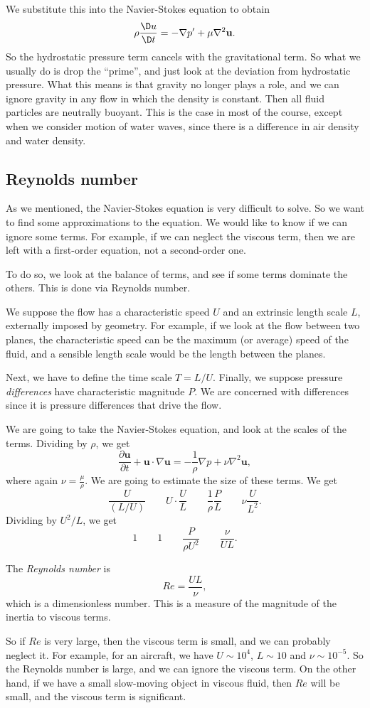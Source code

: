 \documentclass[a4paper]{article}
\begin{document}
We substitute this into the Navier-Stokes equation to obtain
\[
  \rho \frac{\D u}{\D t} = -\nabla p' + \mu \nabla^2 \mathbf{u}.
\]
So the hydrostatic pressure term cancels with the gravitational term. So what we usually do is drop the ``prime'', and just look at the deviation from hydrostatic pressure. What this means is that gravity no longer plays a role, and we can ignore gravity in any flow in which the density is constant. Then all fluid particles are neutrally buoyant. This is the case in most of the course, except when we consider motion of water waves, since there is a difference in air density and water density.

\subsection{Reynolds number}
As we mentioned, the Navier-Stokes equation is very difficult to solve. So we want to find some approximations to the equation. We would like to know if we can ignore some terms. For example, if we can neglect the viscous term, then we are left with a first-order equation, not a second-order one.

To do so, we look at the balance of terms, and see if some terms dominate the others. This is done via Reynolds number.

We suppose the flow has a characteristic speed $U$ and an extrinsic length scale $L$, externally imposed by geometry. For example, if we look at the flow between two planes, the characteristic speed can be the maximum (or average) speed of the fluid, and a sensible length scale would be the length between the planes.

Next, we have to define the time scale $T = L/U$. Finally, we suppose pressure \emph{differences} have characteristic magnitude $P$. We are concerned with differences since it is pressure differences that drive the flow.

We are going to take the Navier-Stokes equation, and look at the scales of the terms. Dividing by $\rho$, we get
\[
  \frac{\partial \mathbf{u}}{\partial t} + \mathbf{u}\cdot \nabla \mathbf{u} = -\frac{1}{\rho} \nabla p + \nu \nabla^2 \mathbf{u},
\]
where again $\nu = \frac{\mu}{\rho}$. We are going to estimate the size of these terms. We get
\[
  \frac{U}{(L/U)} \quad\quad U \cdot \frac{U}{L} \quad\quad \frac{1}{\rho} \frac{P}{L} \quad\quad \nu \frac{U}{L^2}.
\]
Dividing by $U^2/L$, we get
\[
  1 \quad\quad 1 \quad\quad \frac{P}{\rho U^2} \quad\quad \frac{\nu}{UL}.
\]
\begin{defi}
  The \emph{Reynolds number} is
  \[
    Re = \frac{UL}{\nu},
  \]
  which is a dimensionless number. This is a measure of the magnitude of the inertia to viscous terms.
\end{defi}
So if $Re$ is very large, then the viscous term is small, and we can probably neglect it. For example, for an aircraft, we have $U \sim 10^4$, $L \sim 10$ and $\nu \sim 10^{-5}$. So the Reynolds number is large, and we can ignore the viscous term. On the other hand, if we have a small slow-moving object in viscous fluid, then $Re$ will be small, and the viscous term is significant.
\end{document}
